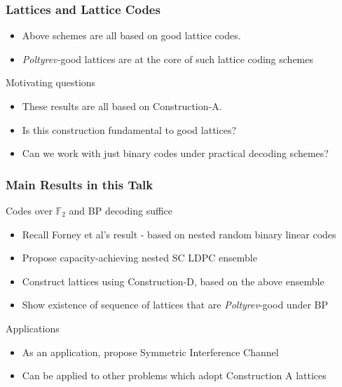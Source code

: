\documentclass[10pt]{beamer}
\begin{document}
\begin{frame}\frametitle{Lattices and Lattice Codes}
\begin{block}{}
			\begin{itemize}
				\item Above schemes are all based on good lattice codes.
				\item	\textit{Poltyrev-}good lattices are at the core of such lattice coding schemes
			\end{itemize}
\end{block}
\pause
\vspace{0.3in}
		\begin{block}{Motivating questions}
			\begin{center}
				\begin{itemize}
						\item These results are all based on Construction-A.
						\item<2-> Is this construction fundamental to good lattices?
						\item<2-> Can we work with just binary codes under practical decoding schemes?
				\end{itemize}
			\end{center}
		\end{block}

\end{frame}


\begin{frame}\frametitle{Main Results in this Talk}

			\begin{block}{Codes over $\mathbb{F}_{2}$ and BP decoding suffice}
				\vspace{1em}
	\begin{itemize}
			\item Recall Forney et al's result - based on nested random binary linear codes
			\item Propose capacity-achieving nested SC LDPC ensemble
			\item Construct lattices using Construction-D, based on the above ensemble
			\item Show existence of sequence of lattices that are \textit{Poltyrev}-good under BP 
	\end{itemize}			
			\end{block}
\pause
\vspace{2em}
		\begin{block}{Applications}
			    \begin{itemize}
        \item As an application, propose {\blue Symmetric Interference Channel}
        \item Can be applied to other problems which adopt Construction A lattices
    			\end{itemize}
		\end{block}

\end{frame}
\end{document}
